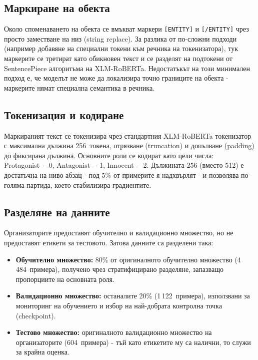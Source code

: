 \documentclass[12pt,a4paper]{report}
\begin{document}
\subsection{Маркиране на обекта}

Около споменаването на обекта се вмъкват маркери \texttt{[ENTITY]} и \texttt{[/ENTITY]} чрез просто заместване на низ (string replace). За разлика от по-сложни подходи (например добавяне на специални токени към речника на токенизатора), тук маркерите се третират като обикновен текст и се разделят на подтокени от SentencePiece алгоритъма на XLM-RoBERTa. Недостатъкът на този минимален подход е, че моделът не може да локализира точно границите на обекта - маркерите нямат специална семантика в речника.

\subsection{Токенизация и кодиране}

Маркираният текст се токенизира чрез стандартния XLM-RoBERTa токенизатор с максимална дължина 256~токена, отрязване (truncation) и допълване (padding) до фиксирана дължина. Основните роли се кодират като цели числа: Protagonist~-- 0, Antagonist~-- 1, Innocent~-- 2. Дължината 256 (вместо 512) е достатъчна на ниво абзац - под 5\% от примерите я надхвърлят - и позволява по-голяма партида, което стабилизира градиентите.

\subsection{Разделяне на данните}

Организаторите предоставят обучително и валидационно множество, но не предоставят етикети за тестовото. Затова данните са разделени така:
\begin{itemize}
  \item \textbf{Обучително множество:} 80\% от оригиналното обучително множество (4\,484~примера), получено чрез стратифицирано разделяне, запазващо пропорциите на основната роля.
  \item \textbf{Валидационно множество:} останалите 20\% (1\,122~примера), използвани за мониторинг на обучението и избор на най-добрата контролна точка (checkpoint).
  \item \textbf{Тестово множество:} оригиналното валидационно множество на организаторите (604~примера) - тъй като етикетите му са налични, то служи за крайна оценка.
\end{itemize}
\end{document}
